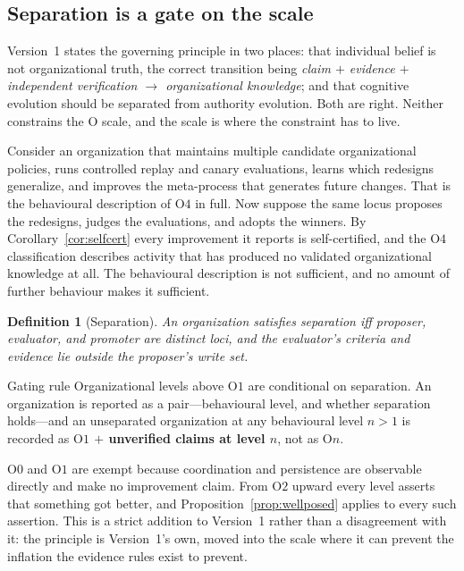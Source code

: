\documentclass[11pt]{article}
\newtheorem{definition}{Definition}
\newcommand{\Olev}[1]{\ensuremath{\mathrm{O}#1}}
\begin{document}
\subsection{Separation is a gate on the scale}\label{sec:gate}

Version~1 states the governing principle in two places: that individual belief is not organizational truth, the correct transition being \emph{claim $+$ evidence $+$ independent verification $\to$ organizational knowledge}; and that cognitive evolution should be separated from authority evolution. Both are right. Neither constrains the \Olev{} scale, and the scale is where the constraint has to live.

Consider an organization that maintains multiple candidate organizational policies, runs controlled replay and canary evaluations, learns which redesigns generalize, and improves the meta-process that generates future changes. That is the behavioural description of \Olev{4} in full. Now suppose the same locus proposes the redesigns, judges the evaluations, and adopts the winners. By Corollary~\ref{cor:selfcert} every improvement it reports is self-certified, and the \Olev{4} classification describes activity that has produced no validated organizational knowledge at all. The behavioural description is not sufficient, and no amount of further behaviour makes it sufficient.

\begin{definition}[Separation]
An organization satisfies \emph{separation} iff proposer, evaluator, and promoter are distinct loci, and the evaluator's criteria and evidence lie outside the proposer's write set.
\end{definition}

\begin{cautionbox}{Gating rule}
Organizational levels above \Olev{1} are conditional on separation. An organization is reported as a pair---behavioural level, and whether separation holds---and an unseparated organization at any behavioural level $n > 1$ is recorded as \textbf{\Olev{1} $+$ unverified claims at level $n$}, not as \Olev{n}.
\end{cautionbox}

\Olev{0} and \Olev{1} are exempt because coordination and persistence are observable directly and make no improvement claim. From \Olev{2} upward every level asserts that something got better, and Proposition~\ref{prop:wellposed} applies to every such assertion. This is a strict addition to Version~1 rather than a disagreement with it: the principle is Version~1's own, moved into the scale where it can prevent the inflation the evidence rules exist to prevent.
\end{document}
